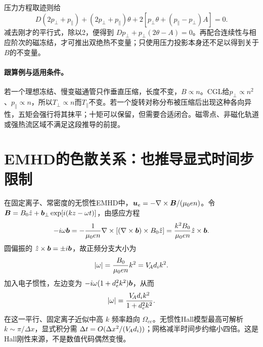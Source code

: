 \documentclass[UTF8,a4paper,11pt,openany,fontset=fandol]{ctexbook}
\begin{document}
压力方程取迹则给
\begin{equation}
 D(2p_\perp+p_\parallel)
 +(2p_\perp+p_\parallel)\theta
 +2[p_\perp\theta+(p_\parallel-p_\perp)A]=0.
\end{equation}
减去刚才的平行式，除以2，便得到
$Dp_\perp+p_\perp(2\theta-A)=0$。再配合连续性与相应阶次的磁冻结，才可推出双绝热不变量；只使用压力投影本身还不足以得到关于$B$的不变量。

\paragraph{跟算例与适用条件。}
若一个理想冻结、慢变磁通管只作垂直压缩，长度不变，$B\propto n$。CGL给$p_\perp\propto n^2$、$p_\parallel\propto n$，所以$T_\perp\propto n$而$T_\parallel$不变。若一个旋转对称分布被压缩后出现这种各向异性，五矩会强行将其抹平；十矩可以保留，但需要合适闭合。磁零点、非磁化轨道或强热流区域不满足这段推导的前提。


\section{EMHD的色散关系：也推导显式时间步限制}
在固定离子、常密度的无惯性EMHD中，$\bm{u}_e=-\nabla\times\bm{B}/(\mu_0en)$。令 $\bm{B}=B_0\hat z+\bm{b}_\perp\exp[i(kz-\omega t)]$，由感应方程
\begin{equation}-i\omega\bm{b}=-{1\over\mu_0en}\nabla\times[(\nabla\times\bm{b})\times B_0\hat z]
={k^2B_0\over\mu_0en}\hat z\times\bm{b}.
\end{equation}
圆偏振的 $\hat z\times\bm{b}=\pm i\bm{b}$，故正频分支大小为
\begin{equation}|\omega|={B_0\over\mu_0en}k^2=V_{\!A} d_i k^2.\label{eq:whistler}\end{equation}
加入电子惯性，左边变为 $-i\omega(1+d_e^2k^2)\bm{b}$，从而
\begin{equation}|\omega|={V_{\!A} d_i k^2\over1+d_e^2k^2}.
\end{equation}
在这一平行、固定离子近似中高 $k$ 频率趋向 $\Omega_{ce}$。无惯性Hall模型最高可解析 $k\sim\pi/\Delta x$，显式积分需 $\Delta t=O(\Delta x^2/(V_{\!A} d_i))$；网格减半时间步约缩小四倍。这是Hall刚性来源，不是数值代码偶然变慢。
\end{document}
